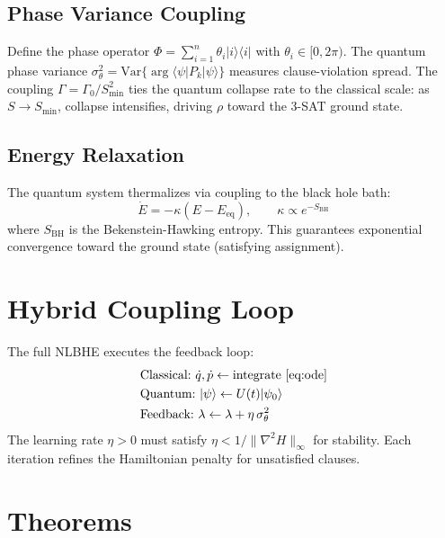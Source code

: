 \documentclass[11pt,letterpaper]{article}
\begin{document}
\subsection{Phase Variance Coupling}
\label{sec:phase_variance}

Define the phase operator $\Phi = \sum_{i=1}^n \theta_i |i\rangle\langle i|$ with
$\theta_i \in [0, 2\pi)$. The quantum phase variance
$\sigma^2_\theta = \mathrm{Var}\{\arg\langle\psi|P_k|\psi\rangle\}$
measures clause-violation spread. The coupling $\Gamma = \Gamma_0 / S_{\min}^2$
ties the quantum collapse rate to the classical scale: as $S \to S_{\min}$, collapse
intensifies, driving $\rho$ toward the 3-SAT ground state.

\subsection{Energy Relaxation}

The quantum system thermalizes via coupling to the black hole bath:
\begin{equation}
\dot{E} = -\kappa(E - E_{\mathrm{eq}}), \qquad \kappa \propto e^{-S_{\mathrm{BH}}}
\label{eq:relax}
\end{equation}
where $S_{\mathrm{BH}}$ is the Bekenstein-Hawking entropy. This guarantees exponential
convergence toward the ground state (satisfying assignment).

\section{Hybrid Coupling Loop}
\label{sec:coupling}

The full NLBHE executes the feedback loop:
\begin{equation}
\begin{aligned}
&\text{Classical:}\ \dot{q}, \dot{p} \leftarrow \text{integrate } \eqref{eq:ode} \\
&\text{Quantum:}\ |\psi\rangle \leftarrow U(t)|\psi_0\rangle \\
&\text{Feedback:}\ \lambda \leftarrow \lambda + \eta\,\sigma^2_\theta
\end{aligned}
\end{equation}
The learning rate $\eta > 0$ must satisfy $\eta < 1/\|\nabla^2 H\|_\infty$ for stability.
Each iteration refines the Hamiltonian penalty for unsatisfied clauses.

\section{Theorems}
\label{sec:theorems}
\end{document}
